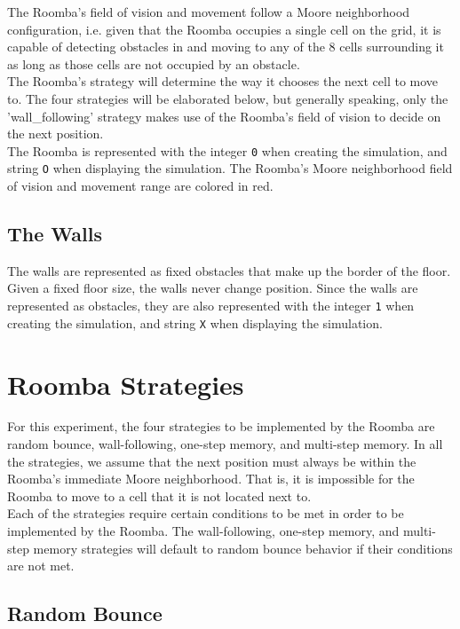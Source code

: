 \documentclass[11pt]{article}
\begin{document}
The Roomba's field of vision and movement follow a Moore neighborhood
configuration, i.e. given that the Roomba occupies a single cell on the
grid, it is capable of detecting obstacles in and moving to any of the 8
cells surrounding it as long as those cells are not occupied by an
obstacle.\\

The Roomba's strategy will determine the way it chooses the next cell to
move to. The four strategies will be elaborated below, but generally
speaking, only the 'wall\_following' strategy makes use of the Roomba's
field of vision to decide on the next position.\\

The Roomba is represented with the integer \texttt{0} when creating the
simulation, and string \texttt{O} when displaying the simulation. The
Roomba's Moore neighborhood field of vision and movement range are
colored in red.

\subsection{The Walls}

The walls are represented as fixed obstacles that make up the border of
the floor. Given a fixed floor size, the walls never change position.
Since the walls are represented as obstacles, they are also represented
with the integer \texttt{1} when creating the simulation, and string
\texttt{X} when displaying the simulation.

\newpage
\section{Roomba Strategies}

For this experiment, the four strategies to be implemented by the Roomba
are random bounce, wall-following, one-step memory, and multi-step
memory. In all the strategies, we assume that the next position must
always be within the Roomba's immediate Moore neighborhood. That is, it
is impossible for the Roomba to move to a cell that it is not located
next to.\\

Each of the strategies require certain conditions to be met in order to
be implemented by the Roomba. The wall-following, one-step memory, and
multi-step memory strategies will default to random bounce behavior if
their conditions are not met.

\subsection{Random Bounce}
\end{document}
